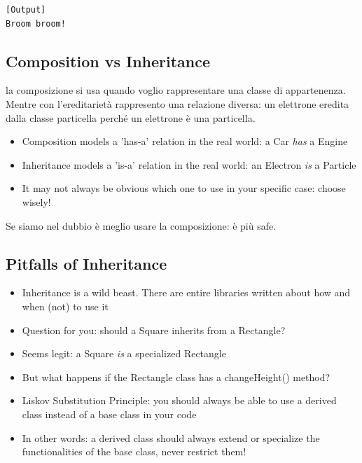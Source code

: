 \inputminted{python}{snippets/composition.py}


\begin{verbatim}
[Output]
Broom broom!
\end{verbatim}


\subsection{Composition vs Inheritance}

la composizione si usa quando voglio rappresentare una classe di appartenenza. Mentre con l'ereditarietà rappresento una relazione diversa: un elettrone eredita dalla classe particella perché un elettrone è una particella.\\
  \begin{itemize}
    \item Composition models a \alert{'has-a'} relation in the real world: a 
          Car \emph{has} a Engine
    \item Inheritance models a \alert{'is-a'} relation in the real world: an
          Electron \emph{is} a Particle
    \item It may not always be obvious which one to use in your specific case:
          choose wisely!
  \end{itemize}
  
Se siamo nel dubbio è meglio usare la composizione: è più safe.


\subsection{Pitfalls of Inheritance}
  \begin{itemize}
    \item Inheritance is a wild beast. There are entire libraries written about how and when (not) to use it
    
    \bigskip
    
    \item Question for you: should a Square inherits from a Rectangle?
    \item Seems legit: a Square \emph{is} a specialized Rectangle
    \item But what happens if the Rectangle class has a changeHeight() method?
    \bigskip
    
    \bigskip
    
    \item \alert{Liskov Substitution Principle}: you should always be able to use
          a derived class instead of a base class in your code
    \item In other words: a derived class should always extend or specialize
          the functionalities of the base class, never restrict them!
   \end{itemize}
   
